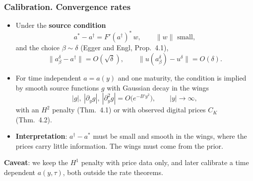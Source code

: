 \begin{frame}
\frametitle{Calibration. Convergence rates}
\begin{scriptsize}
\begin{itemize}
\item Under the \textbf{source condition}
\begin{equation*}
    a^* - a^\dagger = F'(a^\dagger)^*\,w, \qquad \|w\| \text{ small},
\end{equation*}
and the choice $\beta \sim \delta$ (Egger and Engl, Prop.~4.1),
\begin{equation*}
    \|a^\delta_\beta - a^\dagger\| = O(\sqrt{\delta}),
    \qquad
    \|u(a^\delta_\beta) - u^\delta\| = O(\delta).
\end{equation*}

\item For time independent $a = a(y)$ and one maturity, the condition is implied by
smooth source functions $g$ with Gaussian decay in the wings
\begin{equation*}
    |g|,\ |\partial_y g|,\ |\partial_y^2 g| = O\bigl(e^{-B' y^2}\bigr), \qquad |y| \to \infty,
\end{equation*}
with an $H^2$ penalty (Thm.~4.1) or with observed digital prices $C_K$ (Thm.~4.2).

\item \textbf{Interpretation}: $a^\dagger - a^*$ must be small and smooth in the wings,
where the prices carry little information. The wings must come from the prior.
\end{itemize}
\medskip
\textbf{Caveat}: we keep the $H^1$ penalty with price data only,
and later calibrate a time dependent $a(y,\tau)$, both outside the rate theorems.
\end{scriptsize}
\end{frame}

